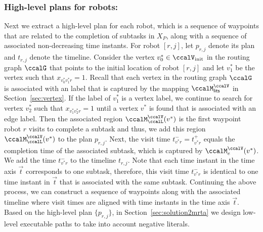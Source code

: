 \documentclass[Afour,sageh,times]{sagej}
\begin{document}
{{\subsubsection{High-level plans for robots:} Next we extract a high-level plan for each robot, which is a sequence of waypoints that are related  to  the completion of subtasks in $X_P$, along with a sequence of associated non-decreasing time instants. For robot $[r,j]$, let $p_{r,j}$ denote its plan and $t_{r,j}$ denote the  timeline. Consider the vertex $v^*_0 \in \ccalV_{\text{init}}$ in the routing graph $\ccalG$ that points to the initial location of  robot $[r,j]$  and let $v^*_1$ be the vertex such that $x_{v^*_0 v^*_1 r} =1$. Recall that each vertex in the routing graph $\ccalG$ is associated with an label that is captured by the mapping $\ccalM_{\mathsf{lits}}^{\ccalV}$ in Section~\ref{sec:vertex}. If the label of $v_1^*$ is a vertex label, we continue to search for vertex $v_2^*$ such that $x_{v_1^* v_2^* r}=1$ until a vertex $v^*$ is found that is associated with an edge label. Then the associated region  $\ccalM^\ccalV_{\ccalL}(v^*)$ is the first waypoint robot $r$ visits to complete a subtask and thus, we add this region $\ccalM^\ccalV_{\ccalL}(v^*)$ to the plan $p_{r,j}$. Next, the visit time  $t^-_{v^* r} = t^+_{v^* r}$ equals the completion time of the associated subtask, which is captured by $\ccalM_{e}^{\ccalV}(v^*)$. We add the time $t^-_{v^* r}$ to the timeline $t_{r,j}$. Note that each time instant in the time axis $\vec{t}$ corresponds to one subtask, therefore, this visit time $t^-_{v^* r}$ is identical to one time instant in $\vec{t}$ that is associated with the same subtask.   Continuing the above process, we can construct a sequence of waypoints along with the associated timeline where visit times are aligned with time instants in the time axis $\vec{t}$. Based on the high-level plan $\{p_{r,j}\}$, in Section~\ref{sec:solution2mrta} we design low-level executable paths to take into account negative literals.

}}
\end{document}
